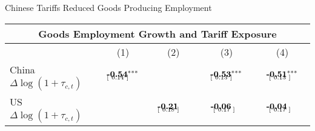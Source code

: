 \documentclass[9pt,pdftex,aspectratio=1610]{beamer}
\theoremstyle{definition}
\begin{document}
\begin{frame}[t]{Chinese Tariffs Reduced Goods Producing Employment}
\vspace{-0.25cm}
\footnotesize
\begin{table}[t]
\footnotesize
\setlength {\tabcolsep}{.15mm}
\renewcommand{\arraystretch}{1.5}
\begin{center}
\begin{tabular}{l c c c c}
\multicolumn{5}{c}{\small \textbf{Goods Employment Growth and Tariff Exposure}}\\
\hline
\hline
& (1) & (2) &  (3)  & (4)   \\
\cmidrule(lr){2-5}
China $\Delta \log (1 + \tau_{c,t})$
&  $\begin{array}{c}\textbf{-0.54}^{***}  \vspace{-.32cm}\\ \scriptstyle [ \ 0.14 \ ]\phantom{^{***}}\end{array}$
&
&  $\begin{array}{c}\textbf{-0.53}^{***}  \vspace{-.32cm}\\ \scriptstyle [ \ 0.13 \ ]\phantom{^{***}}\end{array}$
& $\begin{array}{c}\textbf{-0.51}^{***} \vspace{-.32cm}\\ \scriptstyle \phantom{-}[ \ 0.13 \ ]\phantom{^{***}}\end{array}$
\\

US $\Delta \log (1 + \tau_{c,t})$
&
& $\begin{array}{c}\textbf{-0.21}\phantom{^{***}}  \vspace{-.32cm}\\ \scriptstyle [ \ 0.18 \ ]\phantom{^{***}}\end{array}$
&  $\begin{array}{c}\textbf{-0.06}\phantom{^{***}} \vspace{-.32cm}\\ \scriptstyle \phantom{-}[ \ 0.17 \ ]\phantom{^{***}}\end{array}$
& $\begin{array}{c}\textbf{-0.04}\phantom{^{***}} \vspace{-.32cm}\\ \scriptstyle \phantom{-}[ \ 0.17 \ ]\phantom{^{***}}\end{array}$
\\


\end{tabular}
\end{center}
\end{table}
\end{frame}
\end{document}
